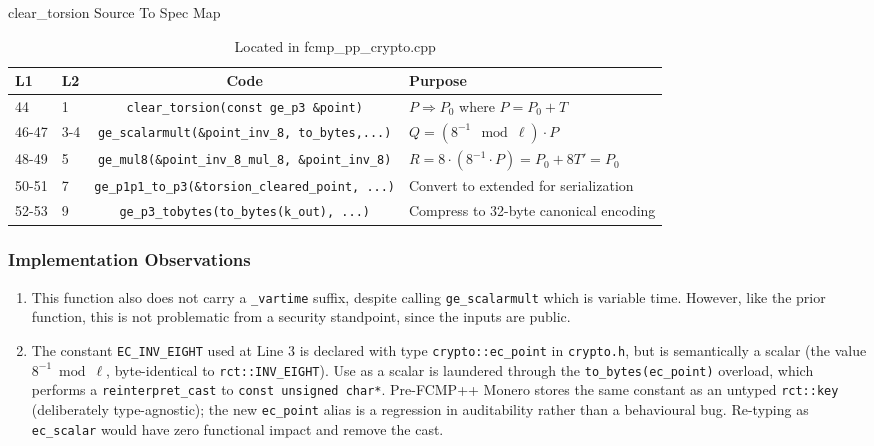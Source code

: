 \documentclass[12pt,titlepage,table]{article}
\begin{document}
\begin{table}[htbp]
\caption{clear\_torsion Source To Spec Map}
\begin{adjustwidth}{-1in}{-1in}
\centering
{
\begin{tabular}{| l | l | c | l |}
\hline
\textbf{L1} & \textbf{L2} & \textbf{Code} & \textbf{Purpose} \\
\hline
\hline
44 & 1  &\verb+clear_torsion(const ge_p3 &point)+ & $P \Rightarrow P_0$ where $P = P_0 + T$ \\
46-47 & 3-4 & \verb|ge_scalarmult(&point_inv_8, to_bytes,...)| & $Q = (8^{-1} \mod \ell) \cdot P$ \\
48-49 & 5 &\verb+ge_mul8(&point_inv_8_mul_8, &point_inv_8)+ &  $R = 8\cdot (8^{-1} \cdot P) = P_0 + 8T' = P_0$\\
50-51 & 7 & \verb|ge_p1p1_to_p3(&torsion_cleared_point, ...)| & Convert to extended for serialization \\
52-53 & 9 &\verb+ge_p3_tobytes(to_bytes(k_out), ...)+ & Compress to 32-byte canonical encoding\\
\hline
\end{tabular}}
\end{adjustwidth}
\caption*{Located in fcmp\_pp\_crypto.cpp}
\end{table}


\subsubsection{Implementation Observations}
\begin{enumerate}
    \item This function also does not carry a \verb+_vartime+ suffix, despite calling \verb+ge_scalarmult+ which is variable time. However, like the prior function, this is not problematic from a security standpoint, since the inputs are public.
    \item The constant \verb+EC_INV_EIGHT+ used at Line 3 is declared with type \verb+crypto::ec_point+ in \verb+crypto.h+, but is semantically a scalar (the value $8^{-1} \bmod \ell$, byte-identical to \verb+rct::INV_EIGHT+).  Use as a scalar is laundered through the \verb+to_bytes(ec_point)+ overload, which performs a \verb+reinterpret_cast+ to \verb+const unsigned char*+.  Pre-FCMP++ Monero stores the same constant as an untyped \verb+rct::key+ (deliberately type-agnostic); the new \verb+ec_point+ alias is a regression in auditability rather than a behavioural bug.  Re-typing as \verb+ec_scalar+ would have zero functional impact and remove the cast.
\end{enumerate}
\end{document}
